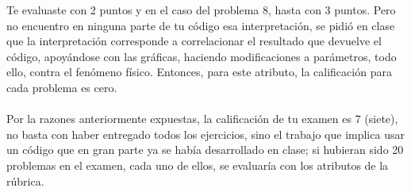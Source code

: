 \documentclass[letterpaper]{article}
\begin{document}
Te evaluaste con 2 puntos y en el caso del problema 8, hasta con 3 puntos. Pero no encuentro en ninguna parte de tu código esa interpretación, se pidió en clase que la interpretación corresponde a correlacionar el resultado que devuelve el código, apoyándose con las gráficas, haciendo modificaciones a parámetros, todo ello, contra el fenómeno físico. Entonces, para este atributo, la calificación para cada problema es cero.
\\
\\
Por la razones anteriormente expuestas, la calificación de tu examen es 7 (siete), no basta con haber entregado todos los ejercicios, sino el trabajo que implica usar un código que en gran parte ya se había desarrollado en clase; si hubieran sido 20 problemas en el examen, cada uno de ellos, se evaluaría con los atributos de la rúbrica.
\end{document}
